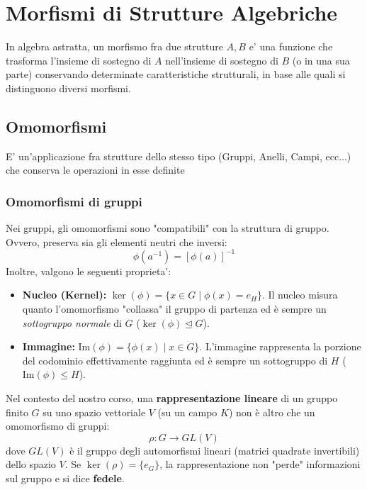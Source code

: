 \section{Morfismi di Strutture Algebriche}
In algebra astratta, un morfismo fra due strutture $A, B$ e' una funzione che trasforma l'insieme di sostegno di $A$ nell'insieme di sostegno di $B$ (o in una sua parte) conservando determinate caratteristiche strutturali, in base alle quali si distinguono diversi morfismi.

\subsection{Omomorfismi}
E' un'applicazione fra strutture dello stesso tipo (Gruppi, Anelli, Campi, ecc...) che conserva le operazioni in esse definite

\subsubsection{Omomorfismi di gruppi}
Nei gruppi, gli omomorfismi sono "compatibili" con la struttura di gruppo. Ovvero, preserva sia gli elementi neutri che inversi:
\[
  \phi(a^{-1}) = [\phi(a)]^{-1}
\]
Inoltre, valgono le seguenti proprieta':
\begin{itemize}
    \item \textbf{Nucleo (Kernel):} $\ker(\phi) = \{x \in G \mid \phi(x) = e_H\}$. Il nucleo misura quanto l'omomorfismo "collassa" il gruppo di partenza ed è sempre un \textit{sottogruppo normale} di $G$ ($\ker(\phi) \trianglelefteq G$).
    \item \textbf{Immagine:} $\text{Im}(\phi) = \{\phi(x) \mid x \in G\}$. L'immagine rappresenta la porzione del codominio effettivamente raggiunta ed è sempre un sottogruppo di $H$ ($\text{Im}(\phi) \le H$).
\end{itemize}

Nel contesto del nostro corso, una \textbf{rappresentazione lineare} di un gruppo finito $G$ su uno spazio vettoriale $V$ (su un campo $K$) non è altro che un omomorfismo di gruppi:
$$ \rho: G \to GL(V) $$
dove $GL(V)$ è il gruppo degli automorfismi lineari (matrici quadrate invertibili) dello spazio $V$. Se $\ker(\rho) = \{e_G\}$, la rappresentazione non "perde" informazioni sul gruppo e si dice \textbf{fedele}.

